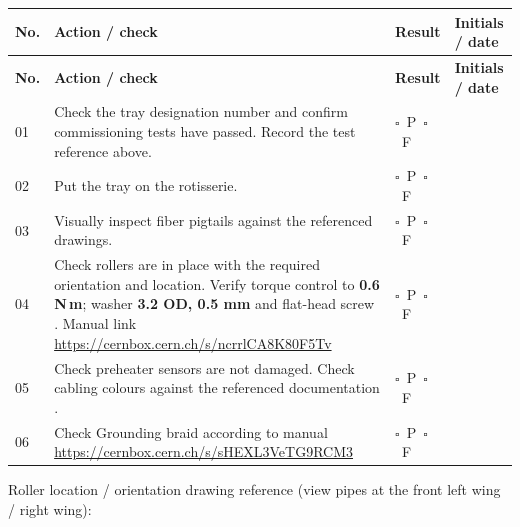 \documentclass[10pt,a4paper]{article}
\newcommand{\cb}{\(\square\)}
\newcommand{\linefield}{\rule{0pt}{6mm}\hrulefill}
\newcommand{\row}[2]{#1 & #2 & \cb\ P\ \cb\ F & \\[1mm]\hline}
\begin{document}
\begin{longtable}{|p{6mm}|p{114mm}|p{18mm}|p{20mm}|}
\hline
\textbf{No.}&\textbf{Action / check}&\textbf{Result}&\textbf{Initials / date}\\\hline
\endfirsthead
\hline
\textbf{No.}&\textbf{Action / check}&\textbf{Result}&\textbf{Initials / date}\\\hline
\endhead
\row{01}{Check the tray designation number and confirm commissioning tests have passed. Record the test reference above.}
\row{02}{Put the tray on the rotisserie.}
\row{03}{Visually inspect fiber pigtails against the referenced drawings.}
\row{04}{Check rollers are in place with the required orientation and location. Verify torque control to \textbf{0.6 N\,m}; washer \textbf{3.2 OD, 0.5 mm} and flat-head screw . Manual link \href{https://cernbox.cern.ch/s/ncrrlCA8K80F5Tv}{https://cernbox.cern.ch/s/ncrrlCA8K80F5Tv}}
\row{05}{Check preheater sensors are not damaged. Check cabling colours against the referenced documentation .}
\row{06}{Check Grounding braid according to manual \href{https://cernbox.cern.ch/s/sHEXL3VeTG9RCM3}{https://cernbox.cern.ch/s/sHEXL3VeTG9RCM3}}
\end{longtable}
\vspace{2mm}
Roller location / orientation drawing reference (view pipes at the front left wing / right wing): \linefield
\end{document}
